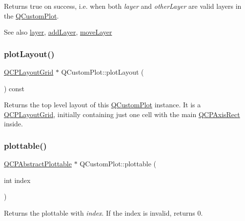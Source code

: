 Returns true on success, i.\+e. when both {\itshape layer} and {\itshape other\+Layer} are valid layers in the \hyperlink{classQCustomPlot}{Q\+Custom\+Plot}.

\begin{DoxySeeAlso}{See also}
\hyperlink{classQCustomPlot_a0a96244e7773b242ef23c32b7bdfb159}{layer}, \hyperlink{classQCustomPlot_ad5255393df078448bb6ac83fa5db5f52}{add\+Layer}, \hyperlink{classQCustomPlot_ae896140beff19424e9e9e02d6e331104}{move\+Layer} 
\end{DoxySeeAlso}
\mbox{\label{classQCustomPlot_af1a1f1f571237deb7c2bd34a5e9f018f}} 
\subsubsection{\texorpdfstring{plot\+Layout()}{plotLayout()}}
{\footnotesize\ttfamily \hyperlink{classQCPLayoutGrid}{Q\+C\+P\+Layout\+Grid} $\ast$ Q\+Custom\+Plot\+::plot\+Layout (\begin{DoxyParamCaption}{ }\end{DoxyParamCaption}) const\hspace{0.3cm}{\ttfamily [inline]}}

Returns the top level layout of this \hyperlink{classQCustomPlot}{Q\+Custom\+Plot} instance. It is a \hyperlink{classQCPLayoutGrid}{Q\+C\+P\+Layout\+Grid}, initially containing just one cell with the main \hyperlink{classQCPAxisRect}{Q\+C\+P\+Axis\+Rect} inside. \mbox{\label{classQCustomPlot_a32de81ff53e263e785b83b52ecd99d6f}} 
\subsubsection{\texorpdfstring{plottable()}{plottable()}\hspace{0.1cm}{\footnotesize\ttfamily [1/2]}}
{\footnotesize\ttfamily \hyperlink{classQCPAbstractPlottable}{Q\+C\+P\+Abstract\+Plottable} $\ast$ Q\+Custom\+Plot\+::plottable (\begin{DoxyParamCaption}\item[{int}]{index }\end{DoxyParamCaption})}

Returns the plottable with {\itshape index}. If the index is invalid, returns 0.

